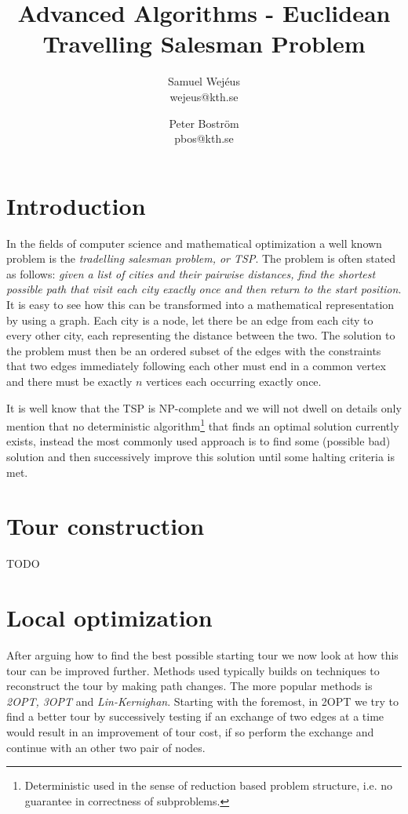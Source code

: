 \documentclass[a4paper,12pt,oneside]{article}
\title{Advanced Algorithms - Euclidean Travelling Salesman Problem}
\author{Samuel Wej\'eus \\ \lowercase{wejeus@kth.se} \and Peter Boström \\ \lowercase{pbos@kth.se} }
\begin{document}
\maketitle

\section{Introduction}
In the fields of computer science and mathematical optimization a well known problem is the \textit{tradelling salesman problem, or TSP}. The problem is often stated as follows: \textit{given a list of cities and their pairwise distances, find the shortest possible path that visit each city exactly once and then return to the start position}. It is easy to see how this can be transformed into a mathematical representation by using a graph. Each city is a node, let there be an edge from each city to every other city, each representing the distance between the two. The solution to the problem must then be an ordered subset of the edges with the constraints that two edges immediately following each other must end in a common vertex and there must be exactly $n$ vertices each occurring exactly once.

It is well know that the TSP is NP-complete and we will not dwell on details only mention that no deterministic algorithm\footnote{Deterministic used in the sense of reduction based problem structure, i.e. no guarantee in correctness of subproblems.} that finds an optimal solution currently exists, instead the most commonly used approach is to find some (possible bad) solution and then successively improve this solution until some halting criteria is met.

\section{Tour construction}
TODO

\section{Local optimization}
After arguing how to find the best possible starting tour we now look at how this tour can be improved further. Methods used typically builds on techniques to reconstruct the tour by making path changes. The more popular methods is \textit{2OPT, 3OPT} and \textit{Lin-Kernighan}. Starting with the foremost, in 2OPT we try to find a better tour by successively testing if an exchange of two edges at a time would result in an improvement of tour cost, if so perform the exchange and continue with an other two pair of nodes.
\end{document}

